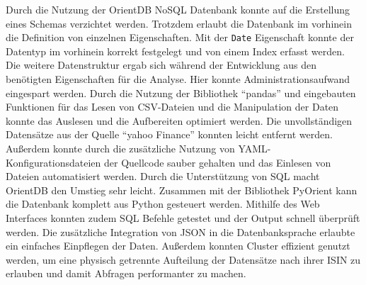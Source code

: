 Durch die Nutzung der OrientDB NoSQL Datenbank konnte auf die Erstellung eines Schemas verzichtet werden. Trotzdem erlaubt die Datenbank im vorhinein die Definition von einzelnen Eigenschaften. Mit der \texttt{Date} Eigenschaft konnte der Datentyp im vorhinein korrekt festgelegt und von einem Index erfasst werden. Die weitere Datenstruktur ergab sich während der Entwicklung aus den benötigten Eigenschaften für die Analyse. Hier konnte Administrationsaufwand eingespart werden. Durch die Nutzung der Bibliothek \enquote{pandas} und eingebauten Funktionen für das Lesen von \gls{CSV}-Dateien und die Manipulation der Daten konnte das Auslesen und die Aufbereiten optimiert werden. Die unvollständigen Datensätze aus der Quelle \enquote{yahoo Finance} konnten leicht entfernt werden. Außerdem konnte durch die zusätzliche Nutzung von \gls{YAML}-Konfigurationsdateien der Quellcode sauber gehalten und das Einlesen von Dateien automatisiert werden. Durch die Unterstützung von \gls{SQL} macht OrientDB den Umstieg sehr leicht. Zusammen mit der Bibliothek PyOrient kann die Datenbank komplett aus Python gesteuert werden. Mithilfe des Web Interfaces konnten zudem \gls{SQL} Befehle getestet und der Output schnell überprüft werden. Die zusätzliche Integration von \gls{JSON} in die Datenbanksprache erlaubte ein einfaches Einpflegen der Daten. Außerdem konnten Cluster effizient genutzt werden, um eine physisch getrennte Aufteilung der Datensätze nach ihrer \gls{ISIN} zu erlauben und damit Abfragen performanter zu machen.


\clearpage